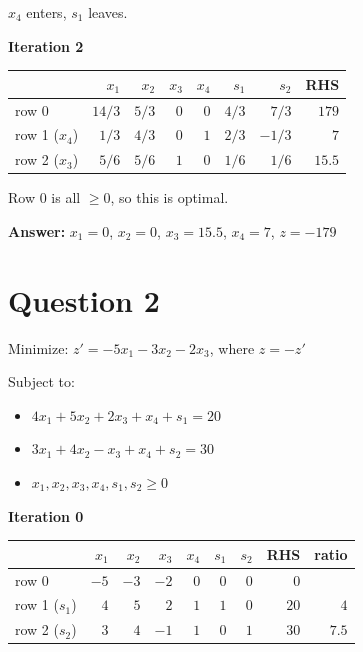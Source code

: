 \documentclass{article}
\begin{document}
$x_4$ enters, $s_1$ leaves.

\textbf{Iteration 2}

\begin{center}
\begin{tabular}{lrrrrrrr}
\toprule
 & $x_1$ & $x_2$ & $x_3$ & $x_4$ & $s_1$ & $s_2$ & RHS \\
\midrule
row 0 & $14/3$ & $5/3$ & $0$ & $0$ & $4/3$ & $7/3$ & $179$ \\
row 1 ($x_4$) & $1/3$ & $4/3$ & $0$ & $1$ & $2/3$ & $-1/3$ & $7$ \\
row 2 ($x_3$) & $5/6$ & $5/6$ & $1$ & $0$ & $1/6$ & $1/6$ & $15.5$ \\
\bottomrule
\end{tabular}
\end{center}

Row 0 is all $\ge 0$, so this is optimal.

\textbf{Answer:} $x_1 = 0$, $x_2 = 0$, $x_3 = 15.5$, $x_4 = 7$, $z = -179$

\section*{Question 2}
Minimize: $z' = -5x_1 - 3x_2 - 2x_3$, where $z = -z'$

Subject to:
\begin{itemize}
    \item $4x_1 + 5x_2 + 2x_3 + x_4 + s_1 = 20$
    \item $3x_1 + 4x_2 - x_3 + x_4 + s_2 = 30$
    \item $x_1, x_2, x_3, x_4, s_1, s_2 \ge 0$
\end{itemize}

\textbf{Iteration 0}

\begin{center}
\begin{tabular}{lrrrrrrrr}
\toprule
 & $x_1$ & $x_2$ & $x_3$ & $x_4$ & $s_1$ & $s_2$ & RHS & ratio \\
\midrule
row 0 & $-5$ & $-3$ & $-2$ & $0$ & $0$ & $0$ & $0$ &  \\
row 1 ($s_1$) & $4$ & $\boxed{5}$ & $2$ & $1$ & $1$ & $0$ & $20$ & $4$ \\
row 2 ($s_2$) & $3$ & $4$ & $-1$ & $1$ & $0$ & $1$ & $30$ & $7.5$ \\
\bottomrule
\end{tabular}
\end{center}
\end{document}

